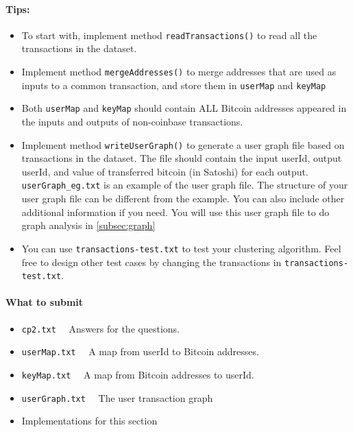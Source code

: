 \documentclass[letterpaper,12pt]{report}
\begin{document}
\paragraph{Tips:}
\begin{itemize}
	\item To start with, implement method \texttt{readTransactions()} to read all the transactions in the dataset.
	\item Implement method \texttt{mergeAddresses()} to merge addresses that are used as inputs to a common transaction, and store them in \texttt{userMap} and \texttt{keyMap}
	\item Both \texttt{userMap} and \texttt{keyMap} should contain ALL Bitcoin addresses appeared in the inputs and outputs of non-coinbase transactions. 
	\item Implement method \texttt{writeUserGraph()} to generate a user graph file based on transactions in the dataset. The file should contain the input userId, output userId, and value of transferred bitcoin (in Satoshi) for each output. \texttt{userGraph\_eg.txt} is an example of the user graph file. The structure of your user graph file can be different from the example. You can also include other additional information if you need. You will use this user graph file to do graph analysis in \ref{subsec:graph} 
	\item You can use \texttt{transactions-test.txt} to test your clustering algorithm. Feel free to design other test cases by changing the transactions in \texttt{transactions-test.txt}.
\end{itemize}

\paragraph{What to submit} 
\begin{itemize}
	\item \texttt{cp2.txt} \ \ Answers for the questions.
	\item \texttt{userMap.txt} \ \ A map from userId to Bitcoin addresses.
	\item \texttt{keyMap.txt} \ \ A map from Bitcoin addresses to userId.
	\item \texttt{userGraph.txt} \ \ The user transaction graph
	\item Implementations for this section
\end{itemize}
\end{document}
